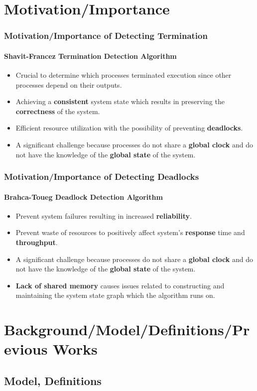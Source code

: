 \documentclass[11pt]{beamer}              %
\begin{document}
\section{Motivation/Importance}
\begin{frame}
\frametitle{Motivation/Importance of Detecting Termination}
\framesubtitle{Shavit-Francez Termination Detection Algorithm}
\begin{itemize}
\item Crucial to determine which processes terminated execution since other processes depend on their outputs.
\item Achieving a \textbf{consistent} system state which results in preserving the \textbf{correctness} of the system.
\item Efficient resource utilization with the possibility of preventing \textbf{deadlocks}.
\item A significant challenge because processes do not share a \textbf{global clock} and do not have the knowledge of the \textbf{global state} of the system.
\end{itemize}

\end{frame}

\begin{frame}
\frametitle{Motivation/Importance of Detecting Deadlocks}
\framesubtitle{Brahca-Toueg Deadlock Detection Algorithm}
\begin{itemize}
\item Prevent system failures resulting in increased \textbf{reliability}.
\item Prevent waste of resources to positively affect system's \textbf{response} time and \textbf{throughput}.
\item A significant challenge because processes do not share a \textbf{global clock} and do not have the knowledge of the \textbf{global state} of the system.
\item \textbf{Lack of shared memory} causes issues related to constructing and maintaining the system state graph which the algorithm runs on.
\end{itemize}
\end{frame}

\section{Background/Model/Definitions/Previous Works}


\subsection{Model, Definitions}
\end{document}
